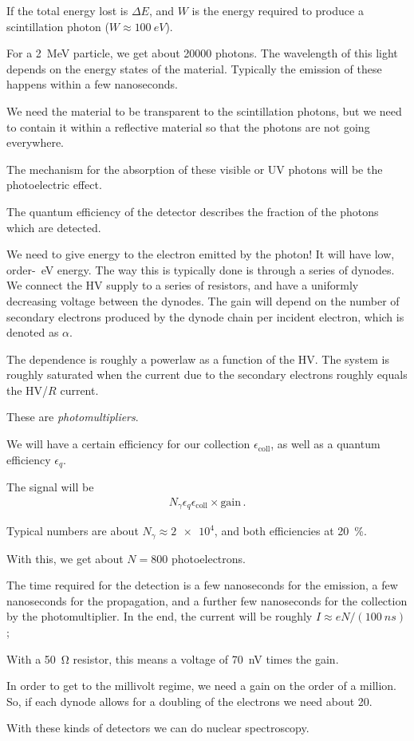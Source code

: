 \documentclass[main.tex]{subfiles}
\begin{document}
If the total energy lost is \(\Delta E\), and \(W\) 
is the energy required to produce a scintillation photon (\(W \approx \SI{100}{eV}\)). 

For a \SI{2}{MeV} particle, we get about 20000 photons. 
The wavelength of this light depends on the energy states of the material. 
Typically the emission of these happens within a few nanoseconds. 

We need the material to be transparent to the scintillation photons, 
but we need to contain it within a reflective material so that the photons are not
going everywhere. 

The mechanism for the absorption of these visible or UV photons will be the photoelectric effect. 

The quantum efficiency of the detector describes the fraction of the photons which are detected. 

We need to give energy to the electron emitted by the photon!
It will have low, order-\SI{}{eV} energy. 
The way this is typically done is through a series of dynodes. 
We connect the HV supply to a series of resistors, and have a uniformly decreasing 
voltage between the dynodes. 
The gain will depend on the number of secondary electrons produced by the dynode chain
per incident electron, which is denoted as \(\alpha \). 

The dependence is roughly a powerlaw as a function of the HV. 
The system is roughly saturated when the current due to the secondary electrons
roughly equals the HV/\(R\) current. 

These are \emph{photomultipliers}. 

We will have a certain efficiency for our collection \(\epsilon _{\text{coll}}\), as well as 
a quantum efficiency \(\epsilon _q\).

The signal will be 
%
\begin{align}
N_\gamma \epsilon _q \epsilon _{\text{coll}} \times \text{gain}
\,.
\end{align}

Typical numbers are about \(N_ \gamma \approx \num{2e4}\), and both efficiencies at \SI{20}{\percent}. 

With this, we get about \(N = 800\) photoelectrons. 

The time required for the detection is a few nanoseconds for the emission, 
a few nanoseconds for the propagation, and a further few nanoseconds for 
the collection by the photomultiplier.
In the end, the current will be roughly \(I \approx eN / (\SI{100}{ns})\); 

With a \SI{50}{\ohm} resistor, this means a voltage of \SI{70}{nV} times the gain. 

In order to get to the millivolt regime, we need a gain on the order of a million. 
So, if each dynode allows for a doubling of the electrons we need about 20. 

With these kinds of detectors we can do nuclear spectroscopy. 
\end{document}
